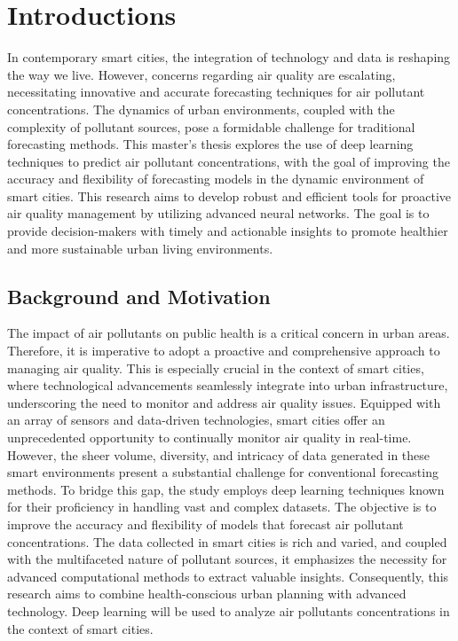 \chapter*{Introductions}

In contemporary smart cities, the integration of technology and data is reshaping the way we live. However, concerns regarding air quality are escalating, necessitating innovative and accurate forecasting techniques for air pollutant concentrations. The dynamics of urban environments, coupled with the complexity of pollutant sources, pose a formidable challenge for traditional forecasting methods. This master's thesis explores the use of deep learning techniques to predict air pollutant concentrations, with the goal of improving the accuracy and flexibility of forecasting models in the dynamic environment of smart cities. This research aims to develop robust and efficient tools for proactive air quality management by utilizing advanced neural networks. The goal is to provide decision-makers with timely and actionable insights to promote healthier and more sustainable urban living environments.

\section*{Background and Motivation}

The impact of air pollutants on public health is a critical concern in urban areas. Therefore, it is imperative to adopt a proactive and comprehensive approach to managing air quality. This is especially crucial in the context of smart cities, where technological advancements seamlessly integrate into urban infrastructure, underscoring the need to monitor and address air quality issues. Equipped with an array of sensors and data-driven technologies, smart cities offer an unprecedented opportunity to continually monitor air quality in real-time. However, the sheer volume, diversity, and intricacy of data generated in these smart environments present a substantial challenge for conventional forecasting methods. To bridge this gap, the study employs deep learning techniques known for their proficiency in handling vast and complex datasets. The objective is to improve the accuracy and flexibility of models that forecast air pollutant concentrations. The data collected in smart cities is rich and varied, and coupled with the multifaceted nature of pollutant sources, it emphasizes the necessity for advanced computational methods to extract valuable insights. Consequently, this research aims to combine health-conscious urban planning with advanced technology. Deep learning will be used to analyze air pollutants concentrations in the context of smart cities.


